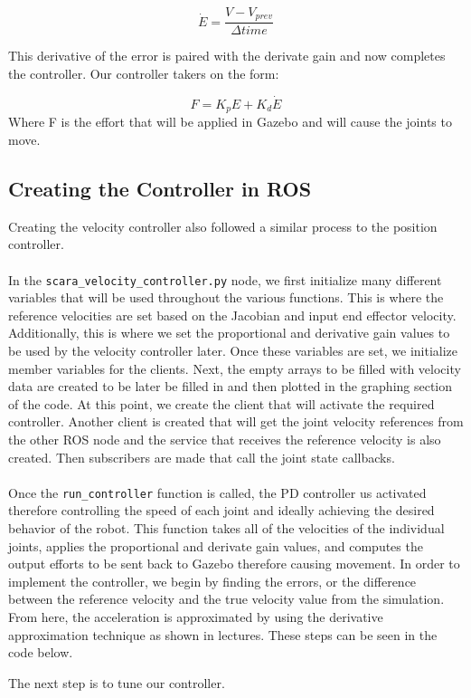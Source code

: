 \documentclass{article}
\begin{document}
\[
    \dot{E} = \frac{V - V_{prev}}{\Delta time}
\]

This derivative of the error is paired with the derivate gain and now completes the controller. Our controller takers on the form: 

\[
    F = K_p E + K_d \dot{E}
\]
Where F is the effort that will be applied in Gazebo and will cause the joints to move.
\vspace{0.25in}
\subsection{Creating the Controller in ROS}
\vspace{0.15in}
Creating the velocity controller also followed a similar process to the position 
controller.\\
\vspace{0in}\\
In the \lstinline{scara_velocity_controller.py} node, we first 
initialize many
 different variables that will be used throughout the various
  functions. This is where the reference velocities are set based
   on the Jacobian and input end effector velocity.
    Additionally, this is where we set the proportional and
     derivative gain values to be used by the 
velocity controller later. Once these variables are set, 
we initialize member variables for the
clients. Next, the empty arrays to be filled with velocity 
data are created to be later be filled in and then 
plotted in the graphing section of the code. 
At this point, we create the client that will activate 
the required controller. Another client is created that will 
get the joint velocity references from the other 
ROS node and the service that receives the reference velocity is also 
created. Then subscribers are made that call the joint state callbacks.\\
\vspace{0in}\\
Once the \lstinline{run_controller} function is called, the PD controller us activated 
therefore controlling the speed of each joint and ideally achieving the desired 
behavior of the robot. This function takes all of the velocities of the individual 
joints, applies the proportional and derivate gain values, and computes the output 
efforts to be sent back to Gazebo therefore causing movement. In order to 
implement the controller, we begin by finding the errors, or the 
difference between the reference velocity and the true velocity value from the 
simulation. From here, the acceleration is approximated by using 
the derivative approximation technique as shown in lectures.
 These steps can be seen in the code below.

The next step is to tune our controller.
\vspace{0.25in}
\end{document}
